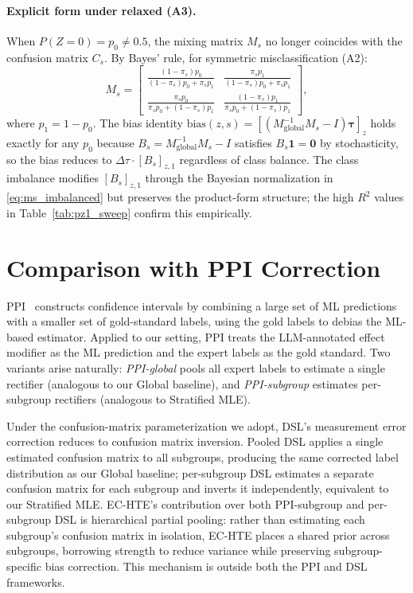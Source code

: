 \paragraph{Explicit form under relaxed (A3).}
When $P(Z{=}0) = p_0 \neq 0.5$, the mixing matrix $M_s$ no longer coincides with the confusion matrix $C_s$.
By Bayes' rule, for symmetric misclassification (A2):
\begin{equation}
M_s = \begin{bmatrix} \frac{(1-\pi_s) p_0}{(1-\pi_s) p_0 + \pi_s p_1} & \frac{\pi_s p_1}{(1-\pi_s) p_0 + \pi_s p_1} \\[4pt]
\frac{\pi_s p_0}{\pi_s p_0 + (1-\pi_s) p_1} & \frac{(1-\pi_s) p_1}{\pi_s p_0 + (1-\pi_s) p_1}
\end{bmatrix},
\label{eq:ms_imbalanced}
\end{equation}
where $p_1 = 1 - p_0$.
The bias identity $\mathrm{bias}(z, s) = [(M_{\mathrm{global}}^{-1} M_s - I) \boldsymbol{\tau}]_z$ holds exactly for any $p_0$ because $B_s = M_{\mathrm{global}}^{-1} M_s - I$ satisfies $B_s \mathbf{1} = \mathbf{0}$ by stochasticity, so the bias reduces to $\Delta\tau \cdot [B_s]_{z,1}$ regardless of class balance.
The class imbalance modifies $[B_s]_{z,1}$ through the Bayesian normalization in \eqref{eq:ms_imbalanced} but preserves the product-form structure; the high $R^2$ values in Table~\ref{tab:pz1_sweep} confirm this empirically.

\section{Comparison with PPI Correction}
\label{app:ppi_comparison}

PPI~\cite{angelopoulos2023ppi} constructs confidence intervals by combining a large set of ML predictions with a smaller set of gold-standard labels, using the gold labels to debias the ML-based estimator.
Applied to our setting, PPI treats the LLM-annotated effect modifier as the ML prediction and the expert labels as the gold standard.
Two variants arise naturally: \emph{PPI-global} pools all expert labels to estimate a single rectifier (analogous to our Global baseline), and \emph{PPI-subgroup} estimates per-subgroup rectifiers (analogous to Stratified MLE).

Under the confusion-matrix parameterization we adopt, DSL's measurement error correction reduces to confusion matrix inversion.
Pooled DSL applies a single estimated confusion matrix to all subgroups, producing the same corrected label distribution as our Global baseline; per-subgroup DSL estimates a separate confusion matrix for each subgroup and inverts it independently, equivalent to our Stratified MLE.
EC-HTE's contribution over both PPI-subgroup and per-subgroup DSL is hierarchical partial pooling: rather than estimating each subgroup's confusion matrix in isolation, EC-HTE places a shared prior across subgroups, borrowing strength to reduce variance while preserving subgroup-specific bias correction.
This mechanism is outside both the PPI and DSL frameworks.

